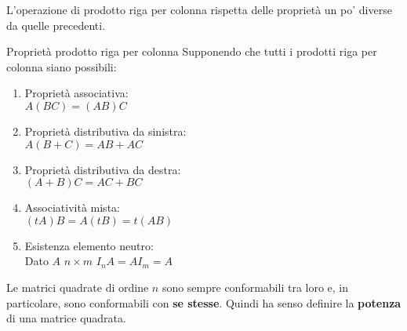 L'operazione di prodotto riga per colonna rispetta delle proprietà un po' diverse da quelle precedenti.
\begin{teo}{Proprietà prodotto riga per colonna}
    Supponendo che tutti i prodotti riga per colonna siano possibili:
    \begin{enumerate}
        \item Proprietà associativa: \\
              $A(BC) = (AB)C$

        \item Proprietà distributiva da sinistra: \\
              $A(B + C) = AB + AC$

        \item Proprietà distributiva da destra: \\
              $(A + B)C = AC + BC$

        \item Associatività mista: \\
              $(tA)B = A(tB) = t(AB)$

        \item Esistenza elemento neutro: \\
              Dato $A$ $n\times m$ $I_nA = AI_m = A$
    \end{enumerate}
\end{teo}

Le matrici quadrate di ordine $n$ sono sempre conformabili tra loro e, in particolare, sono conformabili con \textbf{se stesse}. Quindi ha senso definire la \textbf{potenza} di una matrice quadrata.

